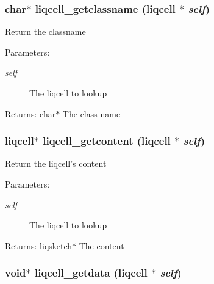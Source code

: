 \subsubsection[{liqcell\_\-getclassname}]{\setlength{\rightskip}{0pt plus 5cm}char$\ast$ liqcell\_\-getclassname (liqcell $\ast$ {\em self})}\label{d5/da2/liqcell_8c_1f758aad20b9e81f8b09726094148ffa}


Return the classname \begin{Desc}
\item[Parameters:]
\begin{description}
\item[{\em self}]The liqcell to lookup \end{description}
\end{Desc}
\begin{Desc}
\item[Returns:]char$\ast$ The class name \end{Desc}
\subsubsection[{liqcell\_\-getcontent}]{\setlength{\rightskip}{0pt plus 5cm}liqcell$\ast$ liqcell\_\-getcontent (liqcell $\ast$ {\em self})}\label{d5/da2/liqcell_8c_17aecaafaec605726bd831d48d1eabe3}


Return the liqcell's content \begin{Desc}
\item[Parameters:]
\begin{description}
\item[{\em self}]The liqcell to lookup \end{description}
\end{Desc}
\begin{Desc}
\item[Returns:]liqsketch$\ast$ The content \end{Desc}
\subsubsection[{liqcell\_\-getdata}]{\setlength{\rightskip}{0pt plus 5cm}void$\ast$ liqcell\_\-getdata (liqcell $\ast$ {\em self})}\label{d5/da2/liqcell_8c_5d2d14389a7635d1ada29b2170617047}


